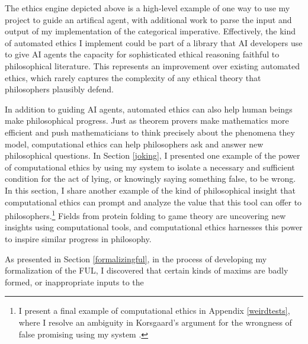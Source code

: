 \begin{isabellebody}
\begin{isamarkuptext}
The ethics engine depicted above is a high-level example of one way to use my project to guide an artifical agent,
with additional work to parse the input and output of my implementation of the categorical imperative.
Effectively, the kind of automated ethics I implement could be part of a library that AI developers use to 
give AI agents the capacity for sophisticated ethical reasoning faithful to philosophical literature. 
This represents an improvement over existing automated ethics, which rarely captures the complexity 
of any ethical theory that philosophers plausibly defend.%
\end{isamarkuptext}\isamarkuptrue%
%
\isadelimdocument
%
\endisadelimdocument
%
\isatagdocument
%
\isamarkuptrue%
%
\endisatagdocument
{\isafolddocument}%
%
\isadelimdocument
%
\endisadelimdocument
%
\begin{isamarkuptext}%
In addition to guiding AI agents, automated ethics can also help human beings make philosophical
progress. Just as theorem provers make mathematics more efficient and push mathematicians to think 
precisely about the phenomena they model, computational ethics can help philosophers ask and answer
new philosophical questions. In Section \ref{joking}, I presented one example of the power of computational ethics
by using my system to isolate a necessary and sufficient condition for the act of lying, or knowingly saying
something false, to be wrong. In this section, I share another example of the kind of philosophical 
insight that computational ethics can prompt and analyze the value that this tool can offer to philosophers.\footnote{
I present a final example of computational ethics in Appendix \ref{weirdtests}, where I resolve an ambiguity 
in Korsgaard's argument for the wrongness of false promising using my system \citep{KorsgaardFUL}.} 
Fields from protein folding to game theory are uncovering new insights using computational tools, and computational
ethics harnesses this power to inspire similar progress in philosophy.%
\end{isamarkuptext}\isamarkuptrue%
%
\isadelimdocument
%
\endisadelimdocument
%
\isatagdocument
%
\isamarkuptrue%
%
\endisatagdocument
{\isafolddocument}%
%
\isadelimdocument
%
\endisadelimdocument
%
\begin{isamarkuptext}%
As presented in Section \ref{formalizingful}, in the process of developing my formalization of
the FUL, I discovered that certain kinds of maxims are badly formed, or inappropriate inputs to the 

\end{isamarkuptext}
\end{isabellebody}
